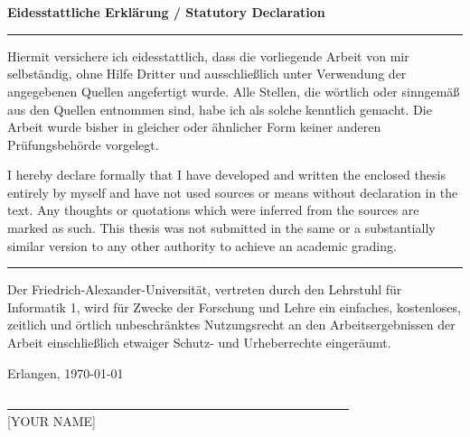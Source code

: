 %
%


\chapter*{\ }


\vspace*{\fill}


\begin{Large}
	\textbf{Eidesstattliche Erklärung / Statutory Declaration}
\end{Large}
\vspace{1.5em}


\noindent\hrule

Hiermit versichere ich eidesstattlich, dass die vorliegende Arbeit von mir
selbständig, ohne Hilfe Dritter und ausschließlich unter Verwendung der
angegebenen Quellen angefertigt wurde. Alle Stellen, die wörtlich oder
sinngemäß aus den Quellen entnommen sind, habe ich als solche kennt\-lich
gemacht. Die Arbeit wurde bisher in gleicher oder ähnlicher Form keiner anderen
Prüfungsbehörde vorgelegt. 
\vspace{1.5em}


I hereby declare formally that I have developed and written the enclosed thesis
entirely by myself and have not used sources or means without declaration in
the text. Any thoughts or quotations which were inferred from the sources are
marked as such. This thesis was not submitted in the same or a substantially
similar version to any other authority to achieve an academic grading. 

\noindent\hrule

\vspace{2em}


Der Friedrich-Alexander-Universität, vertreten durch den Lehrstuhl
für Informatik 1, wird für Zwecke der Forschung und Lehre ein
einfaches, kostenloses, zeitlich und örtlich unbeschränktes
Nutzungsrecht an den Arbeitsergebnissen der Arbeit einschließlich
etwaiger Schutz- und Urheberrechte eingeräumt.


\vspace{2em}

Erlangen, \today
\begin{flushright}
	\underline{\ \ \ \ \ \ \ \ \ \ \ \ \ \ \ \ \ \ \ \ \ \ \ \ \ 
		\ \ \ \ \ \ \ \ \ \ \ \ \ \ \ \ \ \ \ \ \ \ \ \ \ \ \ \ \ 
	} \\
	\small{[YOUR NAME]}
\end{flushright}
